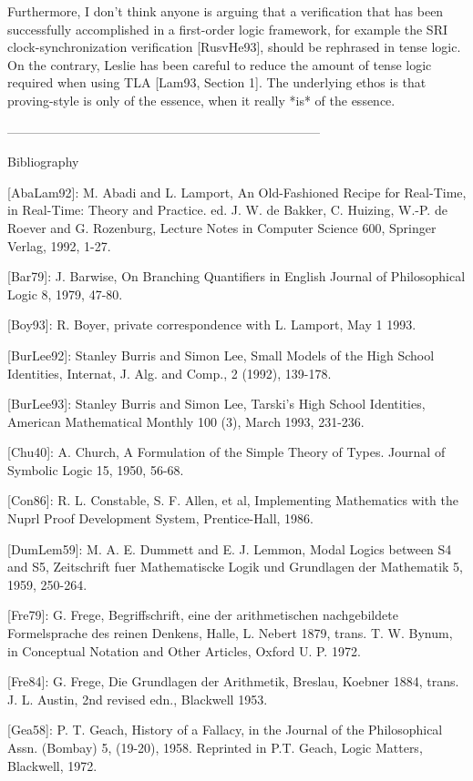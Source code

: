 \begin{spec}
Furthermore, I don't think anyone is arguing that a verification
that has been successfully accomplished in a first-order logic
framework, for example the SRI clock-synchronization verification
[RusvHe93], should be rephrased in tense logic. On the contrary,
Leslie has been careful to reduce the amount of tense logic
required when using TLA [Lam93, Section 1]. The underlying ethos is
that proving-style is only of the essence, when it really *is* of
the essence.

--------------------------------------------------------------------------

Bibliography

[AbaLam92]: M. Abadi and L. Lamport, An Old-Fashioned Recipe for
Real-Time, in Real-Time: Theory and Practice. ed. J. W. de Bakker,
C.  Huizing, W.-P.  de Roever and G. Rozenburg, Lecture Notes in
Computer Science 600, Springer Verlag, 1992, 1-27.

[Bar79]: J. Barwise, On Branching Quantifiers in English
Journal of Philosophical Logic 8, 1979, 47-80.

[Boy93]: R. Boyer, private correspondence with L. Lamport, May 1
1993.

[BurLee92]: Stanley Burris and Simon Lee, Small Models of the High
School Identities, Internat, J. Alg. and Comp., 2 (1992), 139-178.

[BurLee93]: Stanley Burris and Simon Lee, Tarski's High School
Identities, American Mathematical Monthly 100 (3), March 1993,
231-236.

[Chu40]: A. Church, A Formulation of the Simple Theory of Types.
Journal of Symbolic Logic 15, 1950, 56-68.

[Con86]: R. L. Constable, S. F. Allen, et al, Implementing
Mathematics with the Nuprl Proof Development System, Prentice-Hall,
1986.

[DumLem59]: M. A. E. Dummett and E. J. Lemmon, Modal Logics between
S4 and S5, Zeitschrift fuer Mathematiscke Logik und Grundlagen der
Mathematik 5, 1959, 250-264.

[Fre79]: G. Frege, Begriffschrift, eine der arithmetischen
nachgebildete Formelsprache des reinen Denkens, Halle, L. Nebert
1879, trans. T. W.  Bynum, in Conceptual Notation and Other
Articles, Oxford U. P. 1972.

[Fre84]: G. Frege, Die Grundlagen der Arithmetik, Breslau, Koebner
1884, trans. J. L. Austin, 2nd revised edn., Blackwell 1953.

[Gea58]: P. T. Geach, History of a Fallacy, in the Journal of the
Philosophical Assn. (Bombay) 5, (19-20), 1958. Reprinted in
P.T. Geach, Logic Matters, Blackwell, 1972.


\end{spec}
